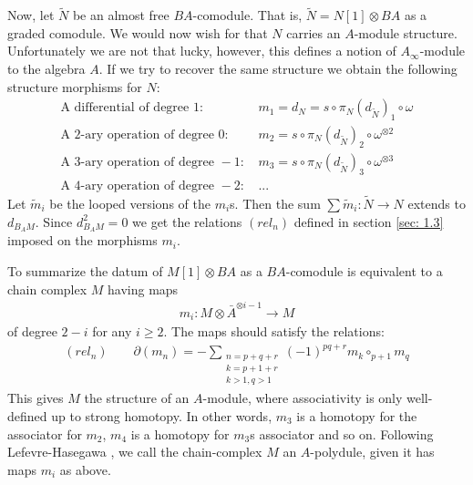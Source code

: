 \documentclass[../thesis.tex]{subfiles}
\begin{document}
            Now, let $\widetilde{N}$ be an almost free $BA$-comodule. That is, $\widetilde{N} = N[1] \otimes BA$ as a graded comodule. We would now wish for that $N$ carries an $A$-module structure. Unfortunately we are not that lucky, however, this defines a notion of $A_\infty$-module to the algebra $A$. If we try to recover the same structure we obtain the following structure morphisms for $N$:
            \begin{align*}
                \text{A differential of degree }1\text{: }& m_1 = d_{N} = s\circ \pi_N (d_{\widetilde{N}})_1 \circ \omega\\
                \text{A 2-ary operation of degree }0\text{: }& m_2 = s\circ \pi_N (d_{\widetilde{N}})_2 \circ \omega^{\otimes 2}\\
                \text{A 3-ary operation of degree }-1\text{: }& m_3 = s\circ \pi_N (d_{\widetilde{N}})_3 \circ \omega^{\otimes 3}\\
                \text{A 4-ary operation of degree }-2\text{: }& \text{...}
            \end{align*}
            Let $\widetilde{m}_i$ be the looped versions of the $m_i$s. Then the sum $\sum \widetilde{m}_i : \widetilde{N} \rightarrow N$ extends to $d_{B_AM}$. Since $d_{B_AM}^2 = 0$ we get the relations $(rel_n)$ defined in section \ref{sec: 1.3} imposed on the morphisms $m_i$. 

            To summarize the datum of $M[1] \otimes BA$ as a  $BA$-comodule is equivalent to a chain complex $M$ having maps 
            \begin{align*}
                m_i : M \otimes \bar{A}^{\otimes i-1} \rightarrow M
            \end{align*}
            of degree $2-i$ for any $i \geq 2$. The maps should satisfy the relations:
            \begin{align*}
                (rel_n) \qquad \partial(m_n) = - \sum_{\substack{n = p + q + r \\ k = p + 1 + r \\ k > 1, q > 1}}(-1)^{pq+r}m_k\circ_{p+1}m_q  
            \end{align*}
            This gives $M$ the structure of an $A$-module, where associativity is only well-defined up to strong homotopy. In other words, $m_3$ is a homotopy for the associator for $m_2$, $m_4$ is a homotopy for $m_3$s associator and so on. Following Lefevre-Hasegawa \cite{LefevreHasegawa03}, we call the chain-complex $M$ an $A$-polydule, given it has maps $m_i$ as above.
\end{document}
